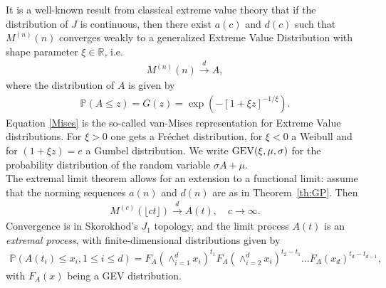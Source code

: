 \documentclass[12pt]{article}
\newcommand{\PP}{\mathbb{P}}
\newcommand{\1}{\mathbf 1}
\begin{document}
It is a well-known result from classical extreme value theory that 
if the distribution of $J$ is continuous, then there exist $a(c)$ and $d(c)$
such that 
$M^{(n)}(n)$ converges weakly to a generalized Extreme Value Distribution with shape parameter $\xi \in \mathbb R$, i.e.
\begin{align}
M^{(n)}(n) \stackrel{d}{\to} A,
\end{align}
where the distribution of $A$ is given by
\begin{align}
\PP(A \le z) = G(z) = \exp\left(-[1+\xi z]^{-1/\xi}\right). \label{Mises}
\end{align}
Equation \eqref{Mises} is the so-called van-Mises representation for Extreme Value distributions. For $\xi>0$ one gets a Fr\'echet distribution, for $\xi<0$ a Weibull and for $(1+\xi z)=e$ a Gumbel distribution. We write ${\rm GEV}(\xi, \mu, \sigma)$ for the probability 
distribution of the random variable $\sigma A + \mu$. \\
The extremal limit theorem allows for an extension to a functional
limit: assume that the norming sequences $a(n)$ and $d(n)$ are as 
in Theorem~\ref{th:GP}. Then 
\begin{align*}
M^{(c)}(\lfloor ct \rfloor)
\stackrel{d}{\to} A(t),
\quad c \to \infty.
\end{align*}
Convergence is in Skorokhod's $J_1$ topology, and the limit
process $A(t)$ is an \emph{extremal process}, with
finite-dimensional distributions given by
\begin{align*}
\PP(A(t_i)\leq x_i,1\leq i \leq d) 
= F_A(\wedge_{i=1}^d x_i)^{t_1} 
F_A(\wedge_{i=2}^d x_i)^{t_2-t_1}
\ldots F_A(x_d)^{t_d-t_{d-1}},
\end{align*}
with $F_A(x)$ being a GEV distribution.
\end{document}
